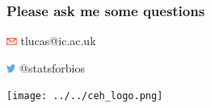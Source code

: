 \documentclass[handout, aspectratio = 169]{beamer}
\begin{document}
    
\begin{frame}

\frametitle{Please ask me some questions}

\vspace{5mm}


\vspace{4mm}

\includegraphics[height=7pt]{Ar_Icon_Contact.pdf} tlucas{\footnotesize{@}}ic.ac.uk

\includegraphics[height=7pt]{Twitter_logo_blue-small.png} {\footnotesize{@}}statsforbios

\vspace{2cm}
\hfill %
\texttt{[image: ../../ceh\_logo.png]}

\end{frame}




 
\end{document}
